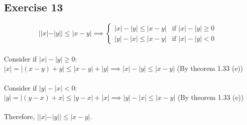 \subsection*{Exercise 13}

\begin{equation}
    ||x| - |y|| \le |x - y| \implies
    \begin{cases}
        |x| - |y| \le |x - y| & \text{if $|x| - |y| \ge 0$}\\
        |y| - |x| \le |x - y| & \text{if $|x| - |y| < 0$}
    \end{cases}
\end{equation} \\
Consider if $|x| - |y| \ge 0$: \\
$|x| = |(x - y) + y| \le |x - y| + |y| \implies |x| - |y| \le |x - y|$ (By theorem 1.33 (e)) \\ \\
Consider if $|y| - |x| < 0$: \\
$|y| = |(y - x) + x| \le |y - x| + |x| \implies |y| - |x| \le |x - y|$ (By theorem 1.33 (e)) \\ \\
Therefore, $||x| - |y|| \le |x - y|$.
